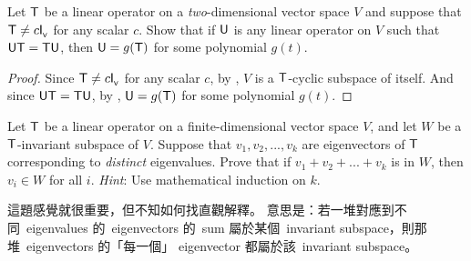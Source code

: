 \begin{exercise} \label{exercise 5.4.22}
Let \(\textsf{T}\) be a linear operator on a \emph{two}-dimensional vector space \(V\) and suppose that \(\textsf{T} \ne c \textsf{I}_{_{\textsf{V}}}{}\) for any scalar \(c\).
Show that if \(\textsf{U}\) is any linear operator on \(V\) such that \(\textsf{U}\textsf{T} = \textsf{T}\textsf{U}\), then \(\textsf{U} = g(\textsf{T})\) for some polynomial \(g(t)\).
\end{exercise}

\begin{proof}
Since \(\textsf{T} \ne c \textsf{I}_{_{\textsf{V}}}{}\) for any scalar \(c\), by , \(V\) is a \(\textsf{T}\)-cyclic subspace of itself.
And since \(\textsf{U}\textsf{T} = \textsf{T}\textsf{U}\), by , \(\textsf{U} = g(\textsf{T})\) for some polynomial \(g(t)\).
\end{proof}

\begin{exercise} \label{exercise 5.4.23}
Let \(\textsf{T}\) be a linear operator on a finite-dimensional vector space \(V\), and let \(W\) be a \(\textsf{T}\)-invariant subspace of \(V\).
Suppose that \(v_1, v_2, ..., v_k\) are eigenvectors of \(\textsf{T}\) corresponding to \emph{distinct} eigenvalues.
Prove that if \(v_1 + v_2 + ... + v_k\) is in \(W\), then \(v_i \in W\) for all \(i\).
\emph{Hint}: Use mathematical induction on \(k\).
\end{exercise}

\begin{note}
這題感覺就很重要，但不知如何找直觀解釋。
意思是：若一堆對應到不同\ eigenvalues 的\ eigenvectors 的\ sum 屬於某個\ invariant subspace，則那堆\ eigenvectors 的「每一個」 eigenvector 都屬於該\ invariant subspace。
\end{note}

